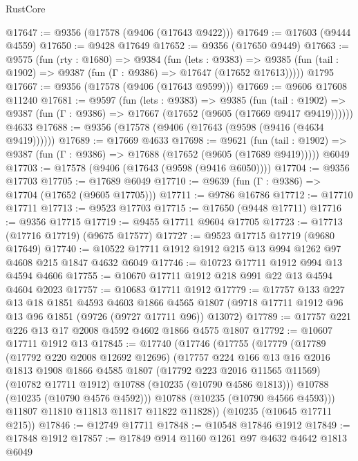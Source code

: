 \begin{lexlean}{RustCore}
\begin{coremodule}
@17647 := @9356 (@17578 (@9406 (@17643 @9422)))
@17649 := @17603 (@9444 @4559)
@17650 := @9428 @17649
@17652 := @9356 (@17650 @9449)
@17663 := @9575
    (fun (rty : @1680) =>
    @9384
      (fun (lets : @9383) =>
      @9385 (fun (tail : @1902) => @9387 (fun (Γ : @9386) => @17647 (@17652 @17613)))))
    @1795
@17667 := @9356 (@17578 (@9406 (@17643 @9599)))
@17669 := @9606 @17608 @11240
@17681 := @9597
    (fun (lets : @9383) =>
    @9385
      (fun (tail : @1902) =>
      @9387 (fun (Γ : @9386) => @17667 (@17652 (@9605 (@17669 @9417 @9419))))))
    @4633
@17688 := @9356 (@17578 (@9406 (@17643 (@9598 (@9416 (@4634 @9419))))))
@17689 := @17669 @4633
@17698 := @9621
    (fun (tail : @1902) => @9387 (fun (Γ : @9386) => @17688 (@17652 (@9605 (@17689 @9419)))))
    @6049
@17703 := @17578 (@9406 (@17643 (@9598 (@9416 @6050))))
@17704 := @9356 @17703
@17705 := @17689 @6049
@17710 := @9639 (fun (Γ : @9386) => @17704 (@17652 (@9605 @17705)))
@17711 := @9786 @16786
@17712 := @17710 @17711
@17713 := @9523 @17703
@17715 := @17650 (@9448 @17711)
@17716 := @9356 @17715
@17719 := @9455 @17711 @9604 @17705
@17723 := @17713 (@17716 @17719) (@9675 @17577)
@17727 := @9523 @17715 @17719 (@9680 @17649)
@17740 := @10522 @17711 @1912 @1912 @215 @13 @994 @1262 @97 @4608 @215 @1847 @4632 @6049
@17746 := @10723 @17711 @1912 @994 @13 @4594 @4606
@17755 := @10670 @17711 @1912 @218 @991 @22 @13 @4594 @4604 @2023
@17757 := @10683 @17711 @1912
@17779 := @17757
    @133
    @227
    @13
    @18
    @1851
    @4593
    @4603
    @1866
    @4565
    @1807
    (@9718 @17711 @1912 @96 @13 @96 @1851 (@9726 (@9727 @17711 @96)) @13072)
@17789 := @17757 @221 @226 @13 @17 @2008 @4592 @4602 @1866 @4575 @1807
@17792 := @10607 @17711 @1912 @13
@17845 := @17740
    (@17746
      (@17755
        (@17779
          (@17789
            (@17792 @220 @2008 @12692 @12696)
            (@17757
              @224
              @166
              @13
              @16
              @2016
              @1813
              @1908
              @1866
              @4585
              @1807
              (@17792 @223 @2016 @11565 @11569)
              (@10782 @17711 @1912)
              @10788
              (@10235 (@10790 @4586 @1813)))
            @10788
            (@10235 (@10790 @4576 @4592)))
          @10788
          (@10235 (@10790 @4566 @4593)))
        @11807
        @11810
        @11813
        @11817
        @11822
        @11828))
    (@10235 (@10645 @17711 @215))
@17846 := @12749 @17711
@17848 := @10548 @17846 @1912
@17849 := @17848 @1912
@17857 := @17849 @914 @1160 @1261 @97 @4632 @4642 @1813 @6049

\end{coremodule}
\end{lexlean}
